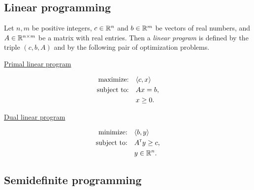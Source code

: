 \subsection*{Linear programming}
\label{sec:linear-programming}
Let $n,m$ be positive integers, $c\in\mathbb{R}^{n}$ and $b\in\mathbb{R}^{m}$ be vectors
of real numbers, and $A \in\mathbb{R}^{n\times m}$ be a matrix with real entries. 
Then a \emph{linear program} is defined by the triple $(c,b,A)$ and by the 
following pair of optimization problems.
\begin{center}
  \begin{minipage}{2in}
    \centerline{\underline{Primal linear program}}\vspace{-7mm}
    \begin{align*}
      \text{maximize:}\quad & \langle c , x\rangle\\
      \text{subject to:}\quad & A x = b,\\
      & x \geq 0.
    \end{align*}
  \end{minipage}
  \hspace*{1.5cm}
  \begin{minipage}{2.4in}
    \centerline{\underline{Dual linear program}}\vspace{-7mm}
    \begin{align*}
      \text{minimize:}\quad & \langle b , y\rangle\\
      \text{subject to:}\quad & A^{{\scriptscriptstyle\mathsf{T}}}y \geq c,\\
      & y\in\mathbb{R}^{n}.
    \end{align*}
  \end{minipage}
\end{center}


\subsection*{Semidefinite programming}
\label{sec:semidefinite-programming}

